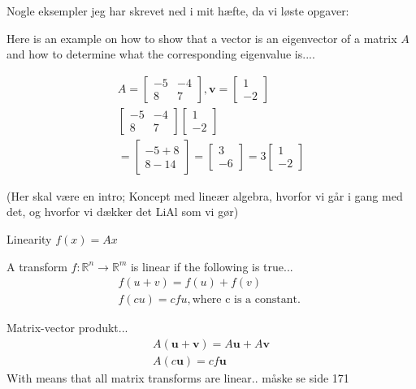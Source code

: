 Nogle eksempler jeg har skrevet ned i mit hæfte, da vi løste opgaver:

Here is an example on how to show that a vector is an eigenvector of a matrix $A$ and how to determine what the corresponding eigenvalue is.... 

\begin{align*}
A = \begin{bmatrix}-5 & -4 \\8 & 7 \end{bmatrix}, \textbf{v} =\begin{bmatrix}1 \\-2\end{bmatrix}\\
\begin{bmatrix}-5 & -4 \\8 & 7 \end{bmatrix} \begin{bmatrix}1 \\-2\end{bmatrix}\\ = \begin{bmatrix}-5 + 8 \\8  -14 \end{bmatrix} = \begin{bmatrix}3 \\-6 \end{bmatrix} = 3\begin{bmatrix}1\\-2 \end{bmatrix}
\end{align*}

(Her skal være en intro; Koncept med lineær algebra, hvorfor vi går i gang med det, og hvorfor vi dækker det LiAl som vi gør)

\begin{definition}{Linearity}
$f(x)=Ax$

A transform $f: \mathbb{R}^n \rightarrow \mathbb{R}^m $ is linear if the following is true... 
\begin{align*}
f(u+v)=f(u)+f(v)\\
f(c u)=c f u ,  \text{where c is a constant. }
\end{align*}

Matrix-vector produkt...
\begin{align*}
A(\textbf{u}+\textbf{v})=A\textbf{u}+A\textbf{v}\\
A(c \textbf{u})=c f\textbf{u}
\end{align*}
With means that all matrix transforms are linear..
måske se side 171
\end{definition}

